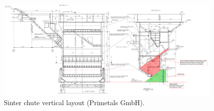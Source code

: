 \begin{figure}[!htb]
\centering
\includegraphics[width=.80\columnwidth]{images/055sinterChuteVerticalLayout}
\caption[Sinter chute vertical layout]{Sinter chute vertical layout (Primetals
GmbH).}
\label{fig:055sinterChuteVerticalLayout}
\end{figure}